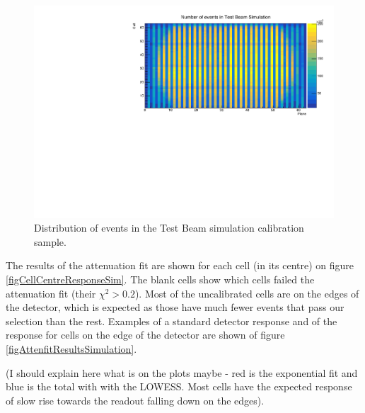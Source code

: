 \documentclass[12pt,a4paper]{article}
\begin{document}
\begin{figure}[h]
\centering
\includegraphics[width=\textwidth]{Plots/Attenprofs_Simulation_CellPlane.pdf}
\caption{Distribution of events in the Test Beam simulation calibration sample.}
\label{figCalibhistSim}
\end{figure}

The results of the attenuation fit are shown for each cell (in its centre) on figure \ref{figCellCentreResponseSim}. The blank cells show which cells failed the attenuation fit (their $\chi^2>0.2$). Most of the uncalibrated cells are on the edges of the detector, which is expected as those have much fewer events that pass our selection than the rest. Examples of a standard detector response and of the response for cells on the edge of the detector are shown of figure \ref{figAttenfitResultsSimulation}.

(I should explain here what is on the plots maybe - red is the exponential fit and blue is the total with with the LOWESS. Most cells have the expected response of slow rise towards the readout falling down on the edges).
\end{document}
